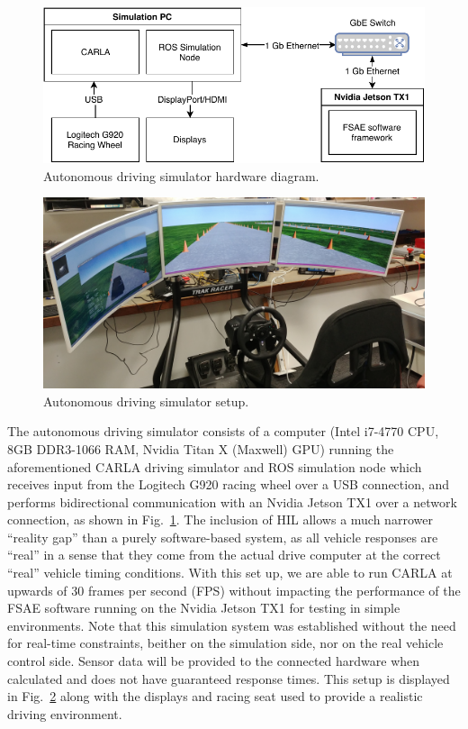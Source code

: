 \begin{figure}[H] 
	\centering
	\includegraphics[width=0.9\columnwidth]{simulationHardwareDiagram}
	\caption{Autonomous driving simulator hardware diagram.}
	\label{fig:8:simulationHardwareDiagram}
\end{figure}

\begin{figure}[H] 
	\centering
	\includegraphics[width=0.8\columnwidth]{simulationHardware}
	\caption{Autonomous driving simulator setup.}
	\label{fig:8:simulationHardware}
\end{figure}

The autonomous driving simulator consists of a computer (Intel i7-4770 CPU, 8GB DDR3-1066 RAM, Nvidia Titan X (Maxwell) GPU) running the aforementioned CARLA driving simulator and ROS simulation node which receives input from the Logitech G920 racing wheel over a USB connection, and performs bidirectional communication with an Nvidia Jetson TX1 over a network connection, as shown in Fig.~\ref{fig:8:simulationHardwareDiagram}.
The inclusion of HIL allows a much narrower ``reality gap'' than a purely software-based system, as all vehicle responses are ``real'' in a sense that they come from the actual drive computer at the correct ``real'' vehicle timing conditions.
With this set up, we are able to run CARLA at upwards of 30 frames per second (FPS) without impacting the performance of the FSAE software running on the Nvidia Jetson TX1 for testing in simple environments.
Note that this simulation system was established without the need for real-time constraints, beither on the simulation side, nor on the real vehicle control side.
Sensor data will be provided to the connected hardware when calculated and does not have guaranteed response times.
This setup is displayed in Fig.~\ref{fig:8:simulationHardware} along with the displays and racing seat used to provide a realistic driving environment.

